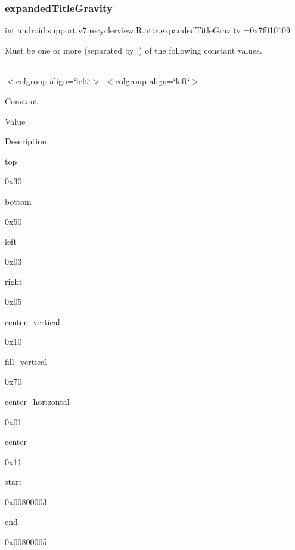 \subsubsection{\texorpdfstring{expanded\+Title\+Gravity}{expandedTitleGravity}}
{\footnotesize\ttfamily int android.\+support.\+v7.\+recyclerview.\+R.\+attr.\+expanded\+Title\+Gravity =0x7f010109\hspace{0.3cm}{\ttfamily [static]}}

Must be one or more (separated by \textquotesingle{}$\vert$\textquotesingle{}) of the following constant values.

\tabulinesep=1mm
\begin{longtabu} spread 0pt [c]{*{0}{|X[-1]}|}
\hline
\end{longtabu}
$<$colgroup align=\char`\"{}left\char`\"{}$>$ $<$colgroup align=\char`\"{}left\char`\"{}$>$ 

Constant

Value

Description 

{\ttfamily top}

0x30

{\ttfamily bottom}

0x50

{\ttfamily left}

0x03

{\ttfamily right}

0x05

{\ttfamily center\+\_\+vertical}

0x10

{\ttfamily fill\+\_\+vertical}

0x70

{\ttfamily center\+\_\+horizontal}

0x01

{\ttfamily center}

0x11

{\ttfamily start}

0x00800003

{\ttfamily end}

0x00800005\mbox{\label{classandroid_1_1support_1_1v7_1_1recyclerview_1_1R_1_1attr_a6eac3614b0b87eeb62f7211fcc408131}} 

